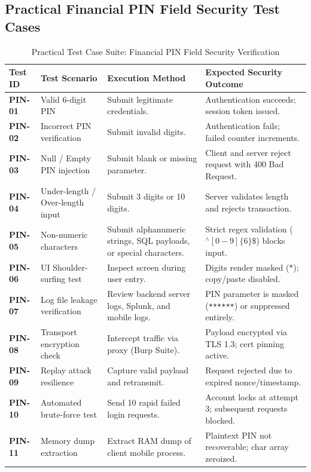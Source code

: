 \subsection{Practical Financial PIN Field Security Test Cases}

\begin{table}[htbp]
\centering
\caption{Practical Test Case Suite: Financial PIN Field Security Verification}
\label{tab:pin_security_testcases}
\begin{tabularx}{\textwidth}{l p{4.2cm} X X}
\toprule
\textbf{Test ID} & \textbf{Test Scenario} & \textbf{Execution Method} & \textbf{Expected Security Outcome} \\
\midrule
\textbf{PIN-01} & Valid 6-digit PIN & Submit legitimate credentials. & Authentication succeeds; session token issued. \\
\textbf{PIN-02} & Incorrect PIN verification & Submit invalid digits. & Authentication fails; failed counter increments. \\
\textbf{PIN-03} & Null / Empty PIN injection & Submit blank or missing parameter. & Client and server reject request with 400 Bad Request. \\
\textbf{PIN-04} & Under-length / Over-length input & Submit 3 digits or 10 digits. & Server validates length and rejects transaction. \\
\textbf{PIN-05} & Non-numeric characters & Submit alphanumeric strings, SQL payloads, or special characters. & Strict regex validation ($^\wedge[0-9]\{6\}\$$) blocks input. \\
\textbf{PIN-06} & UI Shoulder-surfing test & Inspect screen during user entry. & Digits render masked ($\ast$); copy/paste disabled. \\
\textbf{PIN-07} & Log file leakage verification & Review backend server logs, Splunk, and mobile logs. & PIN parameter is masked (\texttt{******}) or suppressed entirely. \\
\textbf{PIN-08} & Transport encryption check & Intercept traffic via proxy (Burp Suite). & Payload encrypted via TLS 1.3; cert pinning active. \\
\textbf{PIN-09} & Replay attack resilience & Capture valid payload and retransmit. & Request rejected due to expired nonce/timestamp. \\
\textbf{PIN-10} & Automated brute-force test & Send 10 rapid failed login requests. & Account locks at attempt 3; subsequent requests blocked. \\
\textbf{PIN-11} & Memory dump extraction & Extract RAM dump of client mobile process. & Plaintext PIN not recoverable; char array zeroized. \\

\end{tabularx}
\end{table}
